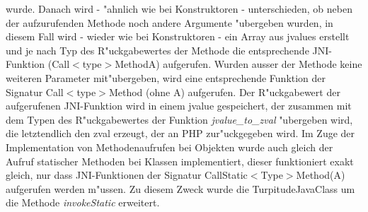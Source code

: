 wurde. Danach wird - "ahnlich wie bei Konstruktoren - unterschieden, ob neben der aufzurufenden Methode noch andere Argumente "ubergeben wurden, in diesem
Fall wird - wieder wie bei Konstruktoren - ein Array aus jvalues erstellt und je nach Typ des R"uckgabewertes der Methode die entsprechende JNI-Funktion
(Call$<$type$>$MethodA) aufgerufen. Wurden ausser der Methode keine weiteren Parameter mit"ubergeben, wird eine entsprechende Funktion der Signatur
Call$<$type$>$Method (ohne A) aufgerufen. Der R"uckgabewert der aufgerufenen JNI-Funktion wird in einem jvalue gespeichert, der zusammen mit dem
Typen des R"uckgabewertes der Funktion \emph{jvalue\_to\_zval} "ubergeben wird, die letztendlich den zval erzeugt, der an PHP zur"uckgegeben wird.
Im Zuge der Implementation von Methodenaufrufen bei Objekten wurde auch gleich der Aufruf statischer Methoden bei Klassen implementiert, dieser funktioniert exakt 
gleich, nur dass JNI-Funktionen der Signatur CallStatic$<$Type$>$Method(A) aufgerufen werden m"ussen. Zu diesem Zweck wurde die TurpitudeJavaClass um die Methode
\emph{invokeStatic} erweitert.

